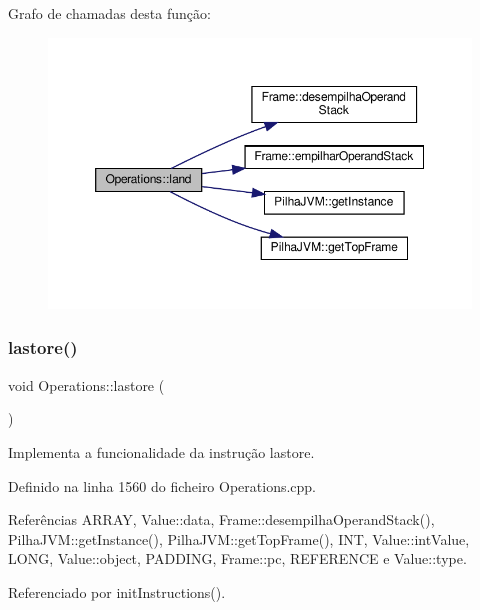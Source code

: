 Grafo de chamadas desta função\+:
\nopagebreak
\begin{figure}[H]
\begin{center}
\leavevmode
\includegraphics[width=350pt]{classOperations_a6104d728be025abb71570139b988ed4e_cgraph}
\end{center}
\end{figure}
\mbox{\label{classOperations_a562813150c331183212c11e5593b83c6}} 
\subsubsection{\texorpdfstring{lastore()}{lastore()}}
{\footnotesize\ttfamily void Operations\+::lastore (\begin{DoxyParamCaption}{ }\end{DoxyParamCaption})\hspace{0.3cm}{\ttfamily [private]}}



Implementa a funcionalidade da instrução lastore. 



Definido na linha 1560 do ficheiro Operations.\+cpp.



Referências A\+R\+R\+AY, Value\+::data, Frame\+::desempilha\+Operand\+Stack(), Pilha\+J\+V\+M\+::get\+Instance(), Pilha\+J\+V\+M\+::get\+Top\+Frame(), I\+NT, Value\+::int\+Value, L\+O\+NG, Value\+::object, P\+A\+D\+D\+I\+NG, Frame\+::pc, R\+E\+F\+E\+R\+E\+N\+CE e Value\+::type.



Referenciado por init\+Instructions().

